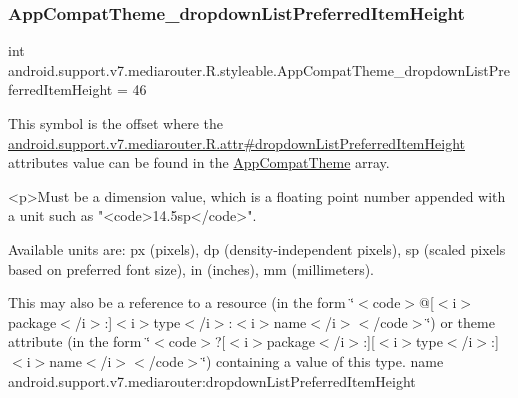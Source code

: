 \subsubsection{\texorpdfstring{App\+Compat\+Theme\+\_\+dropdown\+List\+Preferred\+Item\+Height}{AppCompatTheme\_dropdownListPreferredItemHeight}}
{\footnotesize\ttfamily int android.\+support.\+v7.\+mediarouter.\+R.\+styleable.\+App\+Compat\+Theme\+\_\+dropdown\+List\+Preferred\+Item\+Height = 46\hspace{0.3cm}{\ttfamily [static]}}

This symbol is the offset where the \hyperlink{classandroid_1_1support_1_1v7_1_1mediarouter_1_1R_1_1attr_ab6e7f467aeb2525aa806ff1e7a9c3a4c}{android.\+support.\+v7.\+mediarouter.\+R.\+attr\#dropdown\+List\+Preferred\+Item\+Height} attribute\textquotesingle{}s value can be found in the \hyperlink{classandroid_1_1support_1_1v7_1_1mediarouter_1_1R_1_1styleable_a4e3d3900c75d49aeb2f283cac00214d6}{App\+Compat\+Theme} array.

\begin{DoxyVerb}      <p>Must be a dimension value, which is a floating point number appended with a unit such as "<code>14.5sp</code>".
\end{DoxyVerb}
 Available units are\+: px (pixels), dp (density-\/independent pixels), sp (scaled pixels based on preferred font size), in (inches), mm (millimeters). 

This may also be a reference to a resource (in the form \char`\"{}$<$code$>$@\mbox{[}$<$i$>$package$<$/i$>$\+:\mbox{]}$<$i$>$type$<$/i$>$\+:$<$i$>$name$<$/i$>$$<$/code$>$\char`\"{}) or theme attribute (in the form \char`\"{}$<$code$>$?\mbox{[}$<$i$>$package$<$/i$>$\+:\mbox{]}\mbox{[}$<$i$>$type$<$/i$>$\+:\mbox{]}$<$i$>$name$<$/i$>$$<$/code$>$\char`\"{}) containing a value of this type.  name android.\+support.\+v7.\+mediarouter\+:dropdown\+List\+Preferred\+Item\+Height \mbox{\label{classandroid_1_1support_1_1v7_1_1mediarouter_1_1R_1_1styleable_a63a97be975b87c1a0d46a0ace55382ec}} 
